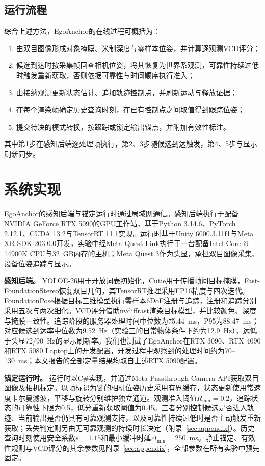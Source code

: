 \documentclass[review]{vgtc}
\begin{document}
\subsection{运行流程}\label{sec:runtime-alg}

综合上述方法，EgoAnchor的在线过程可概括为：
\begin{enumerate}[leftmargin=1.6em,itemsep=1pt,topsep=2pt]
  \item 由双目图像形成对象掩膜、米制深度与零样本位姿，并计算逐观测VCD评分；
  \item 候选到达时按采集帧回查相机位姿，将其恢复为世界系观测，可靠性持续过低时触发重新获取，否则依据可靠性与时间顺序执行准入；
  \item 由接纳观测更新状态估计、追加轨迹控制点，并刷新运动与释放证据；
  \item 在每个渲染帧确定历史查询时刻，在已有控制点之间取值得到跟踪位姿；
  \item 提交待决的模式转换，按跟踪或锁定输出锚点，并附加有效性标注。
\end{enumerate}
其中第1步在感知后端逐处理帧执行，第2、3步随候选到达触发，第4、5步与显示刷新同步。

\section{系统实现}\label{sec:implementation}

EgoAnchor的感知后端与锚定运行时通过局域网通信。感知后端执行于配备NVIDIA GeForce RTX 5090的GPU工作站，基于Python 3.14.6、PyTorch 2.12.1、CUDA 13.2与TensorRT 11.1实现。运行时基于Unity 6000.3.11f1与Meta XR SDK 203.0.0开发，实验中经Meta Quest Link执行于一台配备Intel Core i9-14900K CPU与32~GB内存的主机；Meta Quest 3作为头显，承担双目图像采集、设备位姿追踪与显示。

\textbf{感知后端。}
YOLOE-26用于开放词表初始化，Cutie用于传播帧间目标掩膜，Fast-FoundationStereo恢复双目几何，其TensorRT推理采用FP16精度与四次迭代。FoundationPose根据目标三维模型执行零样本6DoF注册与追踪，注册和追踪分别采用五次与两次细化。VCD评分借助nvdiffrast渲染目标模型，并比较颜色、深度与掩膜一致性。追踪阶段的服务器处理时间中位数为75.44~ms，P95为88.47~ms；对应候选到达率中位数为9.52~Hz（实验三的日常物体条件下约为12.9~Hz），远低于头显72/90~Hz的显示刷新率。我们也测试了EgoAnchor在RTX 3090、RTX 4090和RTX 5080 Laptop上的开发配置，开发过程中观察到的处理时间约为70--130~ms；本文报告的全部定量结果均取自上述RTX 5090配置。

\textbf{锚定运行时。}
运行时以C\#实现，并通过Meta Passthrough Camera API获取双目图像及相机标定。以帧标识为键的相机位姿历史采用有界缓存，状态更新使用常速度卡尔曼滤波，平移与旋转分别维护独立通道。观测准入阈值$R_{\min}=0.2$，追踪状态的可靠性下限为0.5，低分重新获取阈值为0.45。三者分别控制候选是否进入轨迹、当前输出是否仍具有可靠观测支持，以及可靠性持续过低时是否主动触发重新获取；丢失判定则另由无可靠观测的持续时长决定（附录~\ref{sec:appendix}）。历史查询时刻使用安全系数$s=1.15$和最小缓冲时延$\Delta_{\min}=250$~ms。静止锚定、有效性规则与VCD评分的其余参数见附录~\ref{sec:appendix}，全部参数在所有实验中预先固定。
\end{document}
